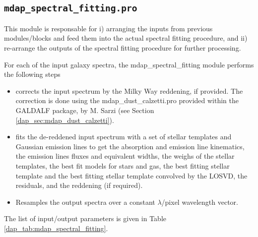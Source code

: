 \subsection{{\tt mdap\_spectral\_fitting.pro}}
\label{dap_sec:mdap_spectral_fitting}

This module is responsable for i) arranging the inputs from previous
modules/blocks and feed them into the actual spectral fitting
procedure, and ii) re-arrange the outputs of the spectral fitting
procedure for further processing.

For each of the input galaxy spectra, the mdap\_spectral\_fitting
module performs the following steps


\begin{itemize}

\item corrects the input spectrum by the Milky Way reddening, if
  provided. The correction is done using the mdap\_dust\_calzetti.pro
  provided within the GALDALF package, by M. Sarzi (see Section
  \ref{dap_sec:mdap_dust_calzetti}).

\item fits the de-reddened input spectrum with a set of stellar
  templates and Gaussian emission lines to get the absorption and
  emission line kinematics, the emission lines fluxes and equivalent
  widths, the weighs of the stellar templates, the best fit models for
  stars and gas, the best fitting stellar template and the best
  fitting stellar template convolved by the LOSVD, the residuals, and
  the reddening (if required).

\item Resamples the output spectra over a constant $\lambda$/pixel
  wavelength vector.

\end{itemize}


The list of input/output parameters is given in Table
\ref{dap_tab:mdap_spectral_fitting}.



